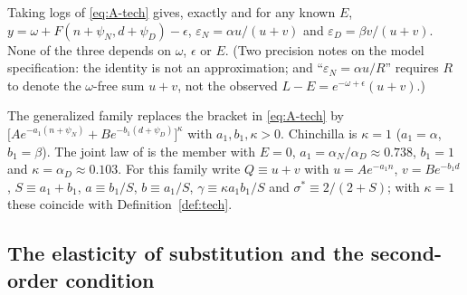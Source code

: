 \begin{remark}\label{rem:exact}
Taking logs of \eqref{eq:A-tech} gives, exactly and for any known $E$,
$y=\omega+F(n+\psi_N,d+\psi_D)-\epsilon$, $\varepsilon_N=\alpha u/(u+v)$ and $\varepsilon_D=\beta v/(u+v)$. None of the
three depends on $\omega$, $\epsilon$ or $E$. (Two precision notes on the model specification: the identity is not an
approximation; and ``$\varepsilon_N=\alpha u/R$'' requires $R$ to denote the $\omega$-free sum $u+v$, not the observed
$L-E=e^{-\omega+\epsilon}(u+v)$.)
\end{remark}

\begin{definition}\label{def:kappa}
The generalized family replaces the bracket in \eqref{eq:A-tech} by
$\big[Ae^{-a_1(n+\psi_N)}+Be^{-b_1(d+\psi_D)}\big]^{\kappa}$ with $a_1,b_1,\kappa>0$. Chinchilla is $\kappa=1$
($a_1=\alpha$, $b_1=\beta$). The joint law of \citet[eq.~1.5]{kaplan2020scaling} is the member with $E=0$,
$a_1=\alpha_N/\alpha_D\approx0.738$, $b_1=1$ and $\kappa=\alpha_D\approx0.103$. For this family write $Q\equiv u+v$
with $u=Ae^{-a_1n}$, $v=Be^{-b_1d}$, $S\equiv a_1+b_1$, $a\equiv b_1/S$, $b\equiv a_1/S$,
$\gamma\equiv\kappa a_1b_1/S$ and $\sigma^*\equiv2/(2+S)$; with $\kappa=1$ these coincide with
Definition~\ref{def:tech}.
\end{definition}

\subsection{The elasticity of substitution and the second-order condition}\label{app:sigma}


